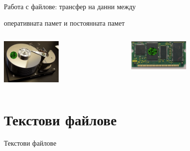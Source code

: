 \documentclass{beamer}
\begin{document}
\begin{frame}
\centerline{Работа с файлове: трансфер на данни между}
\centerline{оперативната памет и постоянната памет}
\begin{columns}[t]
  \begin{column}{0.5\textwidth}
\begin{center}

   \includegraphics[width=3cm]{images/harddisk-oneszeros}
\end{center}
  \end{column}
  \begin{column}{0.5\textwidth}
\begin{center}

   \includegraphics[width=3cm]{images/ramchip-oneszeros}
\end{center}
  \end{column}
\end{columns}

\end{frame}

\section{Текстови файлове}

\begin{frame}
\centerline{Текстови файлове}
\end{frame}
\end{document}
